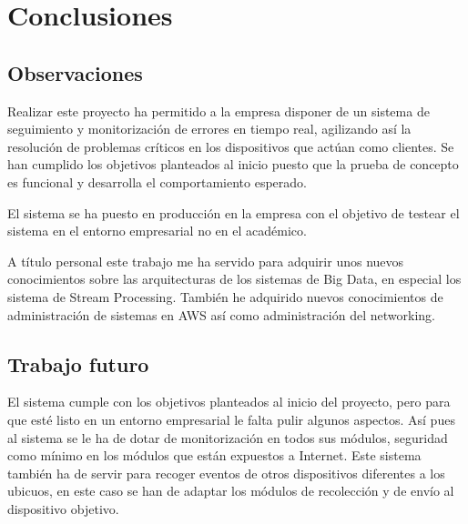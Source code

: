 \chapter{Conclusiones}

\section{Observaciones}

Realizar este proyecto ha permitido a la empresa disponer de un sistema de seguimiento y monitorización de errores en tiempo real, agilizando así la resolución de problemas críticos en los dispositivos que actúan como clientes. Se han cumplido los objetivos planteados al inicio puesto que la prueba de concepto es funcional y desarrolla el comportamiento esperado.

El sistema se ha puesto en producción en la empresa con el objetivo de testear el sistema en el entorno empresarial no en el académico.

A título personal este trabajo me ha servido para adquirir unos nuevos conocimientos sobre las arquitecturas de los sistemas de Big Data, en especial los sistema de Stream Processing. También he adquirido nuevos conocimientos de administración de sistemas en AWS así como administración del networking.

\section{Trabajo futuro}

El sistema cumple con los objetivos planteados al inicio del proyecto, pero para que esté listo en un entorno empresarial le falta pulir algunos aspectos.
Así pues al sistema se le ha de dotar de monitorización en todos sus módulos, seguridad como mínimo en los módulos que están expuestos a Internet.
Este sistema también ha de servir para recoger eventos de otros dispositivos diferentes a los ubicuos, en este caso se han de adaptar los módulos de recolección y de envío al dispositivo objetivo.